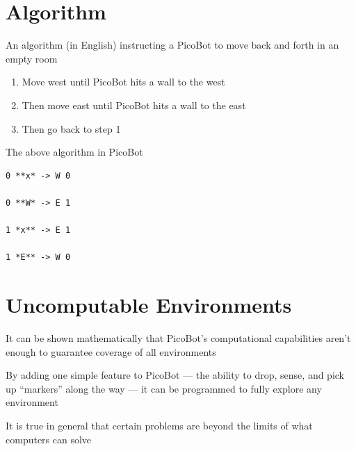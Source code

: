 \documentclass[8pt,a4paper,compress]{beamer}
\begin{document}
\section{Algorithm}
\begin{frame}[fragile]
\pause

An algorithm (in English) instructing a PicoBot to move back and forth in an empty room
\begin{enumerate}
\item Move west until PicoBot hits a wall to the west

\item Then move east until PicoBot hits a wall to the east

\item Then go back to step 1
\end{enumerate}

\pause
\bigskip

The above algorithm in PicoBot
\begin{lstlisting}[language={}]
0 **x* -> W 0

0 **W* -> E 1

1 *x** -> E 1

1 *E** -> W 0
\end{lstlisting}
\end{frame}

\section{Uncomputable Environments}
\begin{frame}[fragile]
\pause

It can be shown mathematically that PicoBot's computational capabilities aren't enough to guarantee coverage of all environments

\pause
\bigskip

By adding one simple feature to PicoBot --- the ability to drop, sense, and pick up ``markers'' along the way --- it can be programmed to fully explore any environment

\pause
\bigskip

It is true in general that certain problems are beyond the limits of what computers can solve
\end{frame}
\end{document}
